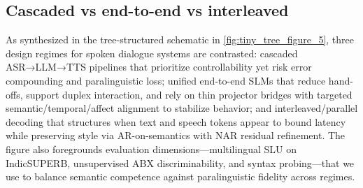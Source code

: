 \documentclass{article}
\begin{document}
\subsection{Cascaded vs end-to-end vs interleaved} \label{subsec:Cascaded vs end-to-end vs interleaved}
As synthesized in the tree-structured schematic in \autoref{fig:tiny_tree_figure_5}, three design regimes for spoken dialogue systems are contrasted: cascaded ASR→LLM→TTS pipelines that prioritize controllability yet risk error compounding and paralinguistic loss; unified end-to-end SLMs that reduce hand-offs, support duplex interaction, and rely on thin projector bridges with targeted semantic/temporal/affect alignment to stabilize behavior; and interleaved/parallel decoding that structures when text and speech tokens appear to bound latency while preserving style via AR-on-semantics with NAR residual refinement. The figure also foregrounds evaluation dimensions—multilingual SLU on IndicSUPERB, unsupervised ABX discriminability, and syntax probing—that we use to balance semantic competence against paralinguistic fidelity across regimes.
\end{document}
